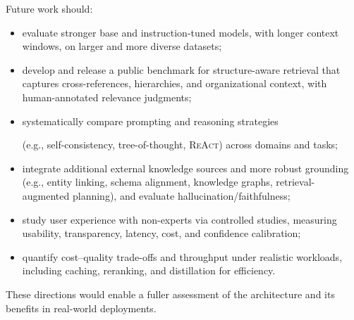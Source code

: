 Future work should:
\begin{itemize}
	\item evaluate stronger base and instruction-tuned models, with longer context windows, on larger and more diverse datasets;
	\item develop and release a public benchmark for structure-aware retrieval that captures cross-references, hierarchies, and organizational context, with human-annotated relevance judgments;
	\item systematically compare prompting and reasoning strategies 
	
	(e.g., self-consistency, tree-of-thought, \textsc{ReAct}) across domains and tasks;
	\item integrate additional external knowledge sources and more robust grounding (e.g., entity linking, schema alignment, knowledge graphs, retrieval-augmented planning), and evaluate hallucination/faithfulness;
	\item study user experience with non-experts via controlled studies, measuring usability, transparency, latency, cost, and confidence calibration;
	\item quantify cost–quality trade-offs and throughput under realistic workloads, including caching, reranking, and distillation for efficiency.
\end{itemize}

These directions would enable a fuller assessment of the architecture and its benefits in real-world deployments.



